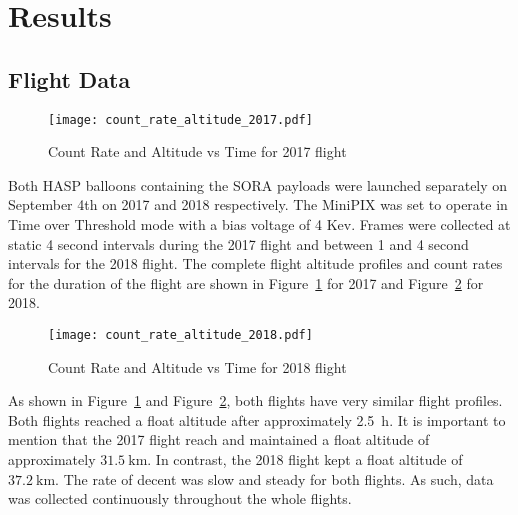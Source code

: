 \section{Results}
\label{Results}

\subsection{Flight Data}

\begin{figure}[H]
\centering
\texttt{[image: count\_rate\_altitude\_2017.pdf]}
\caption{Count Rate and Altitude vs Time for 2017 flight}
\label{fig:ratealttime_2017}
\end{figure}
%
Both HASP balloons containing the SORA payloads were launched separately on September 4th on 2017 and 2018 respectively.  The MiniPIX was set to operate in Time over Threshold mode with a bias voltage of 4 Kev.  Frames were collected at static 4 second intervals during the 2017 flight and between 1 and 4 second intervals for the 2018 flight.  The complete flight altitude profiles and count rates for the duration of the flight are shown in Figure~\ref{fig:ratealttime_2017} for 2017 and Figure~\ref{fig:ratealttime_2018} for 2018.
%
\begin{figure}[H]
\centering
\texttt{[image: count\_rate\_altitude\_2018.pdf]}
\caption{Count Rate and Altitude vs Time for 2018 flight}
\label{fig:ratealttime_2018}
\end{figure}
%
As shown in Figure~\ref{fig:ratealttime_2017} and Figure~\ref{fig:ratealttime_2018}, both flights have very similar flight profiles.  Both flights reached a float altitude after approximately \SI{2.5}{\hour}.  It is important to mention that the 2017 flight reach and maintained a float altitude of approximately $\SI{31.5}{\kilo\meter}$.  In contrast, the 2018 flight kept a float altitude of $\SI{37.2}{\kilo\meter}$.  The rate of decent was slow and steady for both flights.  As such, data was collected continuously throughout the whole flights.
%

